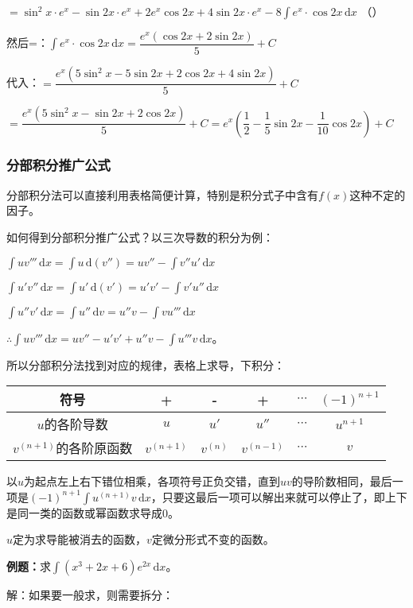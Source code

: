 \documentclass[UTF8, 12pt]{ctexart}
\begin{document}
$=\sin^2x\cdot e^x-\sin2x\cdot e^x+2e^x\cos2x+4\sin2x\cdot e^x-8\int e^x\cdot\cos2x\,\textrm{d}x$ （）

然后=：$\int e^x\cdot\cos2x\,\textrm{d}x=\dfrac{e^x(\cos2x+2\sin2x)}{5}+C$

代入：$=\dfrac{e^x(5\sin^2x-5\sin2x+2\cos2x+4\sin2x)}{5}+C$

$=\dfrac{e^x(5\sin^2x-\sin2x+2\cos2x)}{5}+C=e^x\left(\dfrac{1}{2}-\dfrac{1}{5}\sin2x-\dfrac{1}{10}\cos2x\right)+C$

\subsubsection{分部积分推广公式}

分部积分法可以直接利用表格简便计算，特别是积分式子中含有$f(x)$这种不定的因子。

如何得到分部积分推广公式？以三次导数的积分为例：

$\int uv'''\,\textrm{d}x=\int u\,\textrm{d}(v'')=uv''-\int v''u'\,\textrm{d}x$

$\int u'v''\,\textrm{d}x=\int u'\,\textrm{d}(v')=u'v'-\int v'u''\,\textrm{d}x$

$\int u''v'\,\textrm{d}x=\int u''\,\textrm{d}v=u''v-\int vu'''\,\textrm{d}x$

$\therefore\int uv'''\,\textrm{d}x=uv''-u'v'+u''v-\int u'''v\,\textrm{d}x$。

所以分部积分法找到对应的规律，表格上求导，下积分：\medskip

\begin{tabular}{|c|c|c|c|c|c|}
    \hline
    符号 & + & - & + & $\cdots$ & $(-1)^{n+1}$ \\ \hline
    $u$的各阶导数 & $u$ & $u'$ & $u''$ & $\cdots$ & $u^{n+1}$ \\ \hline
    $v^{(n+1)}$的各阶原函数 & $v^{(n+1)}$ & $v^{(n)}$ & $v^{(n-1)}$ & $\cdots$ & $v$ \\
    \hline
\end{tabular} \medskip

以$u$为起点左上右下错位相乘，各项符号正负交错，直到$uv$的导阶数相同，最后一项是$(-1)^{n+1}\int u^{(n+1)}v\,\textrm{d}x$，只要这最后一项可以解出来就可以停止了，即上下是同一类的函数或幂函数求导成0。

$u$定为求导能被消去的函数，$v$定微分形式不变的函数。

\textbf{例题：}求$\int(x^3+2x+6)e^{2x}\,\textrm{d}x$。

解：如果要一般求，则需要拆分：
\end{document}
